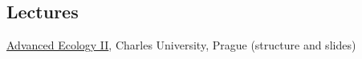 \documentclass[english,11pt,a4paper, landscape]{article}
\begin{document}
\subsection{Lectures}
\href{https://www.cts.cuni.cz/%7Estorch/AdvancedEcology.html}{Advanced Ecology II}, Charles University, Prague (structure and slides)


 

\end{document}
